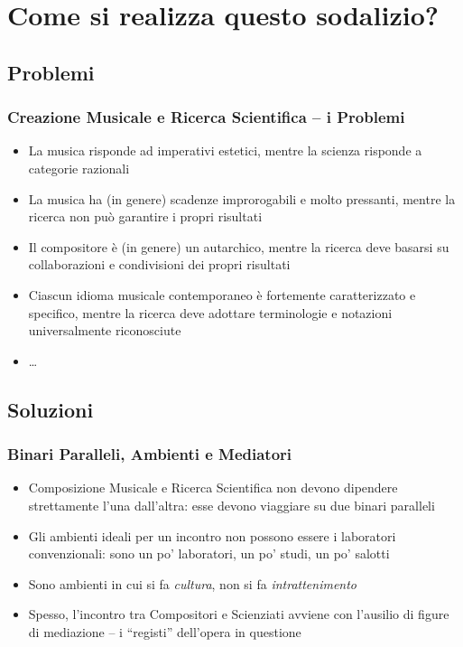 \documentclass[compress]{beamer}
\begin{document}
\section[Come]{Come si realizza questo sodalizio?}

\subsection{Problemi}

\begin{frame}
    \frametitle<+- | alert@+->{Creazione Musicale e Ricerca Scientifica -- i Problemi}

    \begin{itemize}[<+- | alert@+->]
        \item La musica risponde ad imperativi estetici, mentre la scienza
            risponde a categorie razionali
        \item La musica ha (in genere) scadenze improrogabili e molto
            pressanti, mentre la ricerca non pu\`o garantire i propri
            risultati
        \item Il compositore \`e (in genere) un autarchico, mentre la ricerca
            deve basarsi su collaborazioni e condivisioni dei propri risultati
        \item Ciascun idioma musicale contemporaneo \`e fortemente
            caratterizzato e specifico, mentre la ricerca deve adottare
            terminologie e notazioni universalmente riconosciute
        \item \ldots
    \end{itemize}

\end{frame}

\subsection{Soluzioni}

\begin{frame}
    \frametitle<+- | alert@+->{Binari Paralleli, Ambienti e Mediatori}

    \begin{itemize}[<+- | alert@+->]
        \item Composizione Musicale e Ricerca Scientifica non devono dipendere
            strettamente l'una dall'altra: esse devono viaggiare su due binari
            paralleli
        \item Gli ambienti ideali per un incontro non possono essere i laboratori
            convenzionali: sono un po' laboratori, un po' studi, un po'
            salotti
        \item Sono ambienti in cui si fa \emph{cultura}, non si fa \emph{intrattenimento}
        \item Spesso, l'incontro tra Compositori e Scienziati avviene con
            l'ausilio di figure di mediazione -- i ``registi'' dell'opera in
            questione
    \end{itemize}
    
\end{frame}
\end{document}
